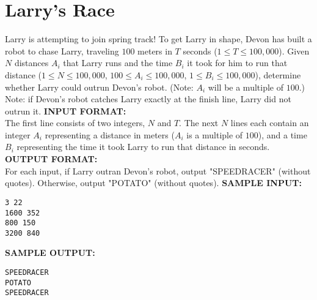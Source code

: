 \documentclass{article}
\begin{document}
\newcommand{\blank}{\vskip 3mm}
\setlength\parindent{0pt}
\renewcommand\thesection{\Alph{section}}

\setcounter{section}{0}
\section{Larry's Race}

Larry is attempting to join spring track! To get Larry in shape, Devon has built a robot to chase Larry, traveling $ 100 $ meters in $ T $ seconds ($ 1 \leq T \leq 100,000 $). Given $ N $ distances $ A_i $ that Larry runs and the time $ B_i $ it took for him to run that distance ($ 1 \leq N \leq 100,000 $, $ 100 \leq A_i \leq 100,000 $, $ 1 \leq B_i \leq 100,000 $), determine whether Larry could outrun Devon's robot. (Note: $ A_i $ will be a multiple of $ 100 $.)
\blank
\noindent Note: if Devon's robot catches Larry exactly at the finish line, Larry did not outrun it.
\blank
\textbf{INPUT FORMAT:}\\
The first line consists of two integers, $ N $ and $ T $.
The next $ N $ lines each contain an integer $ A_i $ representing a distance in meters ($ A_i $ is a multiple of $ 100 $), and a time $ B_i $ representing the time it took Larry to run that distance in seconds.
\blank
\textbf{OUTPUT FORMAT:}\\
For each input, if Larry outran Devon's robot, output "SPEEDRACER" (without quotes). Otherwise, output "POTATO" (without quotes).
\blank
\textbf{SAMPLE INPUT:}
\begin{verbatim}
3 22
1600 352
800 150
3200 840
\end{verbatim}
\textbf{SAMPLE OUTPUT:}
\begin{verbatim}
SPEEDRACER
POTATO
SPEEDRACER
\end{verbatim}
\end{document}
